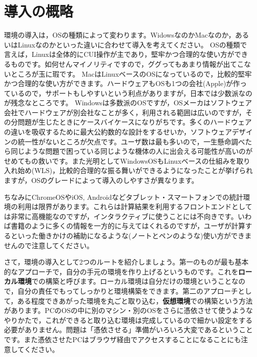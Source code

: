 \documentclass{ltjsbook}
\begin{document}
\section{導入の概略}
環境の導入は，OSの種類によって変わります。WidowsなのかMacなのか，あるいはLinuxなのかといった違いに合わせて導入を考えてください。
OSの種類で言えば，Linuxは全体的にCUI操作が主であり，堅牢かつ合理的な使い方ができるものです。如何せんマイノリティですので，ググってもあまり情報が出てこないところが玉に瑕です。
MacはLinuxベースのOSになっているので，比較的堅牢かつ合理的な使い方ができます。ハードウェアもOSも1つの会社(Apple)が作っているので，サポートもしやすいという利点がありますが，日本では少数派なのが残念なところです。
Windowsは多数派のOSですが，OSメーカはソフトウェア会社でハードウェアが別会社なことが多く，利用される範囲は広いのですが，その分問題が生じたときにケースバイケースになりがちです。多くのハードウェアの違いを吸収するために最大公約数的な設計をするせいか，ソフトウェアデザインの統一性がないところが欠点です。ユーザ数は最も多いので，一生懸命調べたら同じような問題で困っている同じような機体の人に出会える可能性が高いのがせめてもの救いです。また光明としてWindowsOSもLinuxベースの仕組みを取り入れ始め(WLS)，比較的合理的な振る舞いができるようになったことが挙げられますが，OSのグレードによって導入のしやすさが異なります。

ちなみにChromeOSやiOS, Androidなどタブレット・スマートフォンでの統計環境の利用は限界があります。これらは計算結果を利用するフロントエンドとしては非常に高機能なのですが，インタラクティブに使うことには不向きです。いわば書籍のように多くの情報を一方的に与えてはくれるのですが，ユーザが計算するといった働きかけの補助になるような(ノートとペンのような)使い方ができませんので注意してください。

さて，環境の導入として2つのルートを紹介しましょう。第一のものが最も基本的なアプローチで，自分の手元の環境を作り上げるというものです。これを\textbf{ローカル環境}での構築と呼びます。ローカル環境は自分だけの環境ということなので，自分の責任でもってしっかりと環境構築をできます。第二のアプローチとして，ある程度できあがった環境を丸ごと取り込む，\textbf{仮想環境}での構築という方法があります。PCのOSの中に別のマシン・別のOSをさらに憑依させて使うようなやりかたで，これができると取り込む環境は完成しているので細かい設定をする必要がありません。問題は「憑依させる」準備がいろいろ大変であるということです。また憑依させたPCはブラウザ経由でアクセスすることになることにも注意してください。
\end{document}
